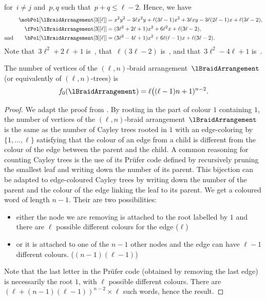 \begin{example}
\[\]
for~$i \ne j$ and~$p, q$ such that~$p + q \le \ell-2$.
Hence, we have
\begin{align*}
\mobPol[{\lBraidArrangement[3][\ell]}] & = x^2 y^2 - 3 \ell x^2 y + \ell (3 \ell - 1) x^2 + 3 \ell x y - 3 \ell (2 \ell - 1) x + \ell (3 \ell - 2) , \\
\fPol[{\lBraidArrangement[3][\ell]}] & = (3 \ell^2 + 2 \ell + 1) x^2 + 6 \ell^2 x + \ell (3 \ell - 2), \\
\text{and}\qquad
\bPol[{\lBraidArrangement[3][\ell]}] & = (3 \ell^2 - 4 \ell + 1) x^2 + 6 \ell (\ell - 1) x + \ell (3 \ell - 2).
\end{align*}
Note that~$3 \ell^2 + 2 \ell + 1$ is~, that~$\ell (3 \ell - 2)$ is~, and that~$3 \ell^2 - 4 \ell + 1$ is~.
\end{example}

\begin{theorem}
\label{thm:verticeslnBraidArrangement}
The number of vertices of the $(\ell,n)$-braid arrangement~$\lBraidArrangement$ (or equivalently of $(\ell,n)$-trees) is
\[
f_0(\lBraidArrangement) = \ell \big( (\ell-1) n + 1)^{n-2}.
\]
\end{theorem}

\begin{proof}
We adapt the proof from \cite{CKSS04}. By rooting in the part of colour $1$ containing $1$, the number of vertices of the $(\ell,n)$-braid arrangement~$\lBraidArrangement$ is the same as the number of Cayley trees rooted in $1$ with an edge-coloring by $\{1, \ldots, \ell\}$ satisfying that the colour of an edge from a child is different from the colour of the edge between the parent and the child. A common reasoning for counting Cayley trees is the use of its Prüfer code defined by recursively pruning the smallest leaf and writing down the number of its parent. This bijection can be adapted to edge-coloured Cayley trees by writing down the number of the parent and the colour of the edge linking the leaf to its parent. We get a coloured word of length $n-1$. Their are two possibilities:
\begin{itemize}
\item either the node we are removing is attached to the root labelled by $1$ and there are $\ell$ possible different colours for the edge ($\ell$)
\item or it is attached to one of the $n-1$ other nodes and the edge can have $\ell-1$ different colours. ($(n-1)(\ell-1)$)
\end{itemize}
 Note that the last letter in the Prüfer code (obtained by removing the last edge) is necessarily the root $1$, with $\ell$ possible different colours.
 There are $(\ell+(n-1)(\ell-1))^{n-2} \times \ell$ such words, hence the result.
\end{proof}

